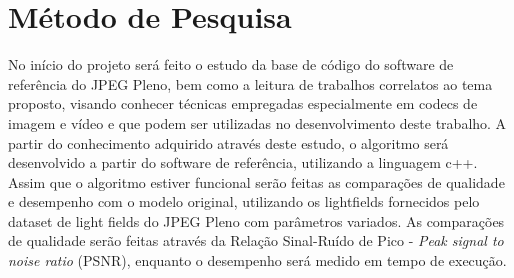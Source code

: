 \section{Método de Pesquisa}
    No início do projeto será feito o estudo da base de código do software de referência do JPEG Pleno, bem como a leitura de trabalhos correlatos ao
    tema proposto, visando conhecer técnicas empregadas especialmente em codecs de imagem e vídeo e que podem ser utilizadas no desenvolvimento deste 
    trabalho. A partir do conhecimento adquirido através deste estudo, o algoritmo será desenvolvido a partir do software de referência, utilizando a 
    linguagem c++. Assim que o algoritmo estiver funcional serão feitas as comparações de qualidade e desempenho com o modelo original, utilizando os 
    lightfields fornecidos pelo dataset de light fields do JPEG Pleno com parâmetros variados. As comparações de qualidade serão feitas através da 
    Relação Sinal-Ruído de Pico - \textit{Peak signal to noise ratio} (PSNR), enquanto o desempenho será medido em tempo de execução.
